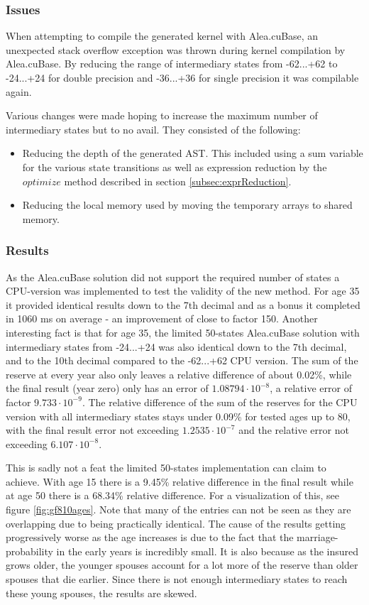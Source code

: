 \subsubsection{Issues}
When attempting to compile the generated kernel with Alea.cuBase, an unexpected stack overflow exception was thrown during kernel compilation by Alea.cuBase.
By reducing the range of intermediary states from -62...+62 to -24...+24 for double precision and -36...+36 for single precision it was compilable again.

Various changes were made hoping to increase the maximum number of intermediary states but to no avail.
They consisted of the following:
\begin{itemize}
\item Reducing the depth of the generated AST. This included using a sum variable for the various state transitions as well as expression reduction by the $optimize$ method described in section \ref{subsec:exprReduction}.
\item Reducing the local memory used by moving the temporary arrays to shared memory.
\end{itemize}

\subsubsection{Results}
As the Alea.cuBase solution did not support the required number of states a CPU-version was implemented to test the validity of the new method.
For age 35 it provided identical results down to the 7th decimal and as a bonus it completed in 1060 ms on average - an improvement of close to factor 150.
Another interesting fact is that for age 35, the limited 50-states Alea.cuBase solution with intermediary states from -24...+24 was also identical down to the 7th decimal, and to the 10th decimal compared to the -62...+62 CPU version.
The sum of the reserve at every year also only leaves a relative difference of about 0.02\%, while the final result (year zero) only has an error of $1.08794 \cdot 10^{-8}$, a relative error of factor $9.733 \cdot 10^{-9}$.
The relative difference of the sum of the reserves for the CPU version with all intermediary states stays under 0.09\% for tested ages up to 80, with the final result error not exceeding $1.2535 \cdot 10^{-7}$ and the relative error not exceeding $6.107 \cdot 10^{-8}$.

This is sadly not a feat the limited 50-states implementation can claim to achieve. 
With age 15 there is a 9.45\% relative difference in the final result while at age 50 there is a 68.34\% relative difference.
For a visualization of this, see figure \ref{fig:gf810ages}. 
Note that many of the entries can not be seen as they are overlapping due to being practically identical.
The cause of the results getting progressively worse as the age increases is due to the fact that the marriage-probability in the early years is incredibly small.
It is also because as the insured grows older, the younger spouses account for a lot more of the reserve than older spouses that die earlier.
Since there is not enough intermediary states to reach these young spouses, the results are skewed.

